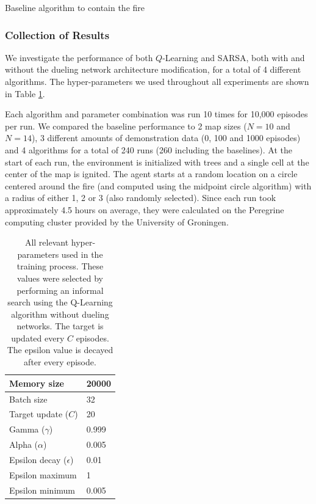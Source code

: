 \begin{algorithm}
  \caption{Baseline algorithm to contain the fire}
  \label{alg:baseline}
  \begin{algorithmic}[1]
    \EndIf
    \EndWhile
    \State {}
    \EndProcedure
  \end{algorithmic}
\end{algorithm}

\subsubsection{Collection of Results}\label{sec:datacollection}
We investigate the performance of both $Q$-Learning and SARSA, both with and without the dueling network architecture modification, for a total of 4 different algorithms. The hyper-parameters we used throughout all experiments are shown in Table \ref{tab:hyperparameters}.

Each algorithm and parameter combination was run 10 times for 10,000 episodes per run. We compared the baseline performance to 2 map sizes ($N=10$ and $N=14$), 3 different amounts of demonstration data (0, 100 and 1000 episodes) and 4 algorithms for a total of 240 runs (260 including the baselines). At the start of each run, the environment is initialized with trees and a single cell at the center of the map is ignited. The agent starts at a random location on a circle centered around the fire (and computed using the midpoint circle algorithm) with a radius of either 1, 2 or 3 (also randomly selected). Since each run took approximately 4.5 hours on average, they were calculated on the Peregrine computing cluster provided by the University of Groningen.

\begin{table}[H]
\centering
\begin{tabular}{|l|l|}
\hline
Memory size & 20000 \\ \hline
Batch size & 32 \\ \hline
Target update ($C$) & 20 \\ \hline
Gamma ($\gamma$) & 0.999 \\ \hline
Alpha ($\alpha$) & 0.005 \\ \hline
Epsilon decay ($\epsilon$) & 0.01 \\ \hline
Epsilon maximum & 1 \\ \hline
Epsilon minimum & 0.005 \\ \hline
\end{tabular}
\caption{All relevant hyper-parameters used in the training process. These values were selected by performing an informal search using the Q-Learning algorithm without dueling networks. The target is updated every $C$ episodes. The epsilon value is decayed after every episode.}
\label{tab:hyperparameters}
\end{table}

